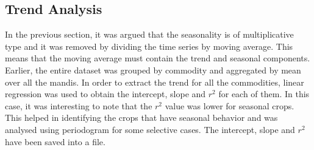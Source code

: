 \documentclass{article}
\begin{document}
\subsection{Trend Analysis}
In the previous section, it was argued that the seasonality is of multiplicative type and it was removed by dividing the time series by moving average. This means that the moving average must contain the trend and seasonal components. Earlier, the entire dataset was grouped by commodity and aggregated by mean over all the mandis. In order to extract the trend for all the commodities, linear regression was used to obtain the intercept, slope and $r^2$ for each of them. In this case, it was interesting to note that the $r^2$ value was lower for seasonal crops. This helped in identifying the crops that have seasonal behavior and was analysed using periodogram for some selective cases. The intercept, slope and $r^2$ have been saved into a file. 
\end{document}
